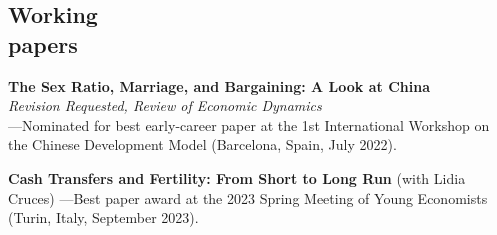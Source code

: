 \documentclass[margin]{res} %
\begin{document}
\begin{resume}
\section{Working \\ papers}
{\bf The Sex Ratio, Marriage, and Bargaining: A Look at China}  \\
\textit{Revision Requested, Review of Economic Dynamics} \\
---Nominated for best early-career paper at the 1st International Workshop on the Chinese Development Model (Barcelona, Spain, July 2022). 


{\bf Cash Transfers and Fertility: From Short to Long Run} (with Lidia Cruces)
---Best paper award at the 2023 Spring Meeting of Young Economists (Turin, Italy, September 2023). 



\end{resume}
\end{document}
